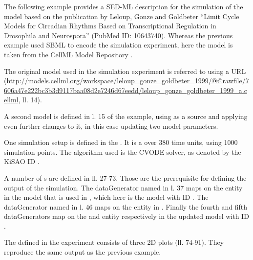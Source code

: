 The following example provides a SED-ML description for the simulation of the model based on the publication by Leloup, Gonze and Goldbeter ``Limit Cycle Models for Circadian Rhythms Based on Transcriptional Regulation in Drosophila and Neurospora'' (PubMed ID: 10643740).
Whereas the previous example used SBML to encode the simulation experiment, here the model is taken from the CellML Model Repository \citep{LLH+08}. 

The original model used in the simulation experiment is referred to using a URL (\url{http://models.cellml.org/workspace/leloup_gonze_goldbeter_1999/@@rawfile/7606a47e222bc3b3d9117baa08d2e7246d67eedd/leloup_gonze_goldbeter_1999_a.cellml}, ll. 14).

A second model is defined in l. 15 of the example, using  as a source and applying even further changes to it, in this case updating two model parameters.

One simulation setup is defined in the . It is a  over 380 time units, using 1000 simulation points. The algorithm used is the CVODE solver, as denoted by the KiSAO ID .

A number of s are defined in ll. 27-73. Those are the prerequisite for defining the output of the simulation. The dataGenerator named  in l. 37 maps on the  entity in the model that is used in , which here is the model with ID . The dataGenerator named  in l. 46 maps on the  entity in . Finally  the fourth and fifth dataGenerators map on the  and  entity respectively in the updated model with ID .

The  defined in the experiment consists of three 2D plots (ll. 74-91). They reproduce the same output as the previous example. 

%
%



